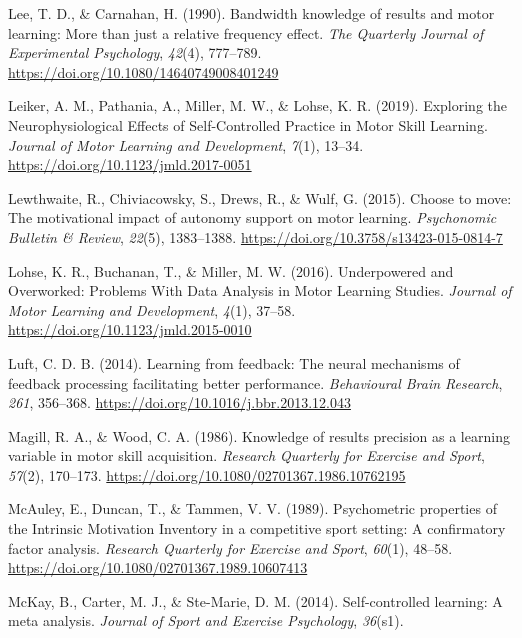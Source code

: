 \documentclass[
  doc, donotrepeattitle,floatsintext]{apa7}
\newlength{\cslhangindent}
\newlength{\cslentryspacingunit} %
\newenvironment{CSLReferences}[2] %
 {%
  \setlength{\parindent}{0pt}
  \ifodd #1
  \let\oldpar\par
  \def\par{\hangindent=\cslhangindent\oldpar}
  \fi
  \setlength{\parskip}{#2\cslentryspacingunit}
 }%
 {}
\begin{document}
\begin{CSLReferences}{1}{0}
\leavevmode{}%
Lee, T. D., \& Carnahan, H. (1990). Bandwidth knowledge of results and motor learning: More than just a relative frequency effect. \emph{The Quarterly Journal of Experimental Psychology}, \emph{42}(4), 777--789. \url{https://doi.org/10.1080/14640749008401249}

\leavevmode{}%
Leiker, A. M., Pathania, A., Miller, M. W., \& Lohse, K. R. (2019). Exploring the {Neurophysiological} {Effects} of {Self}-{Controlled} {Practice} in {Motor} {Skill} {Learning}. \emph{Journal of Motor Learning and Development}, \emph{7}(1), 13--34. \url{https://doi.org/10.1123/jmld.2017-0051}

\leavevmode{}%
Lewthwaite, R., Chiviacowsky, S., Drews, R., \& Wulf, G. (2015). Choose to move: {The} motivational impact of autonomy support on motor learning. \emph{Psychonomic Bulletin \& Review}, \emph{22}(5), 1383--1388. \url{https://doi.org/10.3758/s13423-015-0814-7}

\leavevmode{}%
Lohse, K. R., Buchanan, T., \& Miller, M. W. (2016). Underpowered and Overworked: Problems With Data Analysis in Motor Learning Studies. \emph{Journal of Motor Learning and Development}, \emph{4}(1), 37--58. \url{https://doi.org/10.1123/jmld.2015-0010}

\leavevmode{}%
Luft, C. D. B. (2014). Learning from feedback: The neural mechanisms of feedback processing facilitating better performance. \emph{Behavioural Brain Research}, \emph{261}, 356--368. \url{https://doi.org/10.1016/j.bbr.2013.12.043}

\leavevmode{}%
Magill, R. A., \& Wood, C. A. (1986). Knowledge of results precision as a learning variable in motor skill acquisition. \emph{Research Quarterly for Exercise and Sport}, \emph{57}(2), 170--173. \url{https://doi.org/10.1080/02701367.1986.10762195}

\leavevmode{}%
McAuley, E., Duncan, T., \& Tammen, V. V. (1989). Psychometric properties of the {Intrinsic} {Motivation} {Inventory} in a competitive sport setting: A confirmatory factor analysis. \emph{Research Quarterly for Exercise and Sport}, \emph{60}(1), 48--58. \url{https://doi.org/10.1080/02701367.1989.10607413}

\leavevmode{}%
McKay, B., Carter, M. J., \& Ste-Marie, D. M. (2014). Self-controlled learning: {A} meta analysis. \emph{Journal of Sport and Exercise Psychology}, \emph{36}(s1).


\end{CSLReferences}
\end{document}
